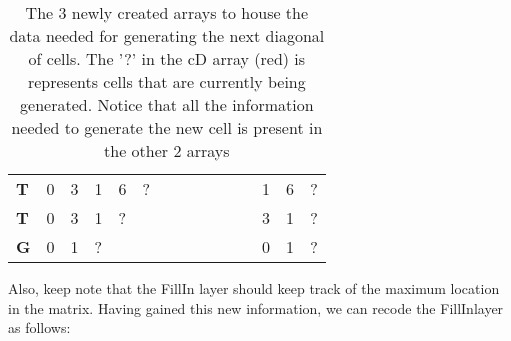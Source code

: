 \begin{table}[H]
\begin{tabular}{|l|lllllllllll|l|l|l|}
		\textbf{T}                      & 0                                 & 3                               & \cellcolor[HTML]{9AFF99}1       & \cellcolor[HTML]{96FFFB}6       & \cellcolor[HTML]{FFCCC9}?       &                                 &                                 &                                 &                                 &                 &           & \cellcolor[HTML]{9AFF99}1 & \cellcolor[HTML]{96FFFB}6 & \cellcolor[HTML]{FFCCC9}? \\ \cline{1-1} \cline{13-15} 
		\textbf{T}                      & 0                                 & \cellcolor[HTML]{9AFF99}3       & \cellcolor[HTML]{96FFFB}1       & \cellcolor[HTML]{FFCCC9}?       &                                 &                                 &                                 &                                 &                                 &                 &           & \cellcolor[HTML]{9AFF99}3 & \cellcolor[HTML]{96FFFB}1 & \cellcolor[HTML]{FFCCC9}? \\ \cline{1-1} \cline{13-15} 
		\textbf{G}                      & \cellcolor[HTML]{9AFF99}0         & \cellcolor[HTML]{96FFFB}1       & \cellcolor[HTML]{FFCCC9}?       &                                 &                                 &                                 &                                 &                                 &                                 &                 &           & \cellcolor[HTML]{9AFF99}0 & \cellcolor[HTML]{96FFFB}1 & \cellcolor[HTML]{FFCCC9}? \\ \cline{1-1} \cline{13-15} 
	\end{tabular}
	\caption{The 3 newly created arrays to house the data needed for generating the next diagonal of cells. The '?' in the cD array (red) is represents cells that are currently being generated. Notice that all the information needed to generate the new cell is present in the other 2 arrays}
	\label{tbl:arraytable}
\end{table}

Also, keep note that the FillIn layer should keep track of the maximum location in the matrix. Having gained this new information, we can recode the FillInlayer as follows:

